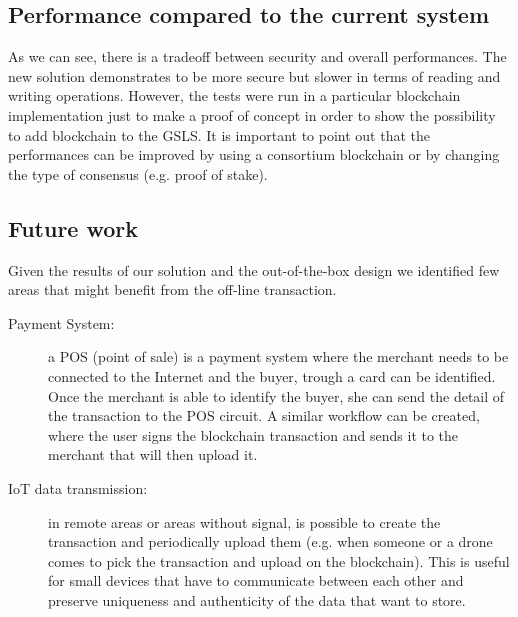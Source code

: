 \subsection{Performance compared to the current system}

As we can see, there is a tradeoff between security and overall performances. The new solution demonstrates to be more secure but slower in terms of reading and writing operations. However, the tests were run in a particular blockchain implementation just to make a proof of concept in order to show the possibility to add blockchain to the GSLS. It is important to point out that the performances can be improved by using a consortium blockchain or by changing the type of consensus (e.g. proof of stake).

\subsection{Future work}

Given the results of our solution and the out-of-the-box design we identified few areas that might benefit from the off-line transaction.

\begin{description}
    
    \item[Payment System:] a POS (point of sale) is a payment system where the merchant needs to be connected to the Internet and the buyer, trough a card can be identified. Once the merchant is able to identify the buyer, she can send the detail of the transaction to the POS circuit.
    A similar workflow can be created, where the user signs the blockchain transaction and sends it to the merchant that will then upload it.

    \item[IoT data transmission:] in remote areas or areas without signal, is possible to create the transaction and periodically upload them (e.g. when someone or a drone comes to pick the transaction and upload on the blockchain). This is useful for small devices that have to communicate between each other and preserve uniqueness and authenticity of the data that want to store.
    
\end{description}
